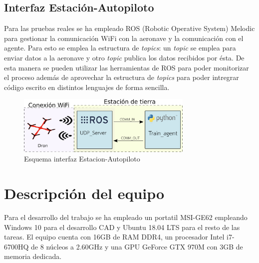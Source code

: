

\subsection{Interfaz Estación-Autopiloto}

Para las pruebas reales se ha empleado ROS (Robotic Operative System) Melodic para gestionar la comunicación WiFi con la aeronave y la comunicación con el agente. Para esto se emplea la estructura de \textit{topics}: un \textit{topic} se emplea para enviar datos a la aeronave y otro \textit{topic} publica los datos recibidos por ésta. De esta manera se pueden utilizar las herramientas de ROS para poder monitorizar el proceso además de aprovechar la estructura de \textit{topics} para poder intregrar código escrito en distintos lenguajes de forma sencilla.

\begin{figure}[htb!]
	\centering
	\includegraphics[width=0.75\textwidth]{software/Arquitectura}
	\caption{Esquema interfaz Estacion-Autopiloto}
	\label{hardware:esc_explicacion}
\end{figure}





\section{Descripción del equipo}
Para el desarrollo del trabajo se ha empleado un portatil MSI-GE62 empleando Windows 10 para el desarrollo CAD y Ubuntu 18.04 LTS para el resto de las tareas. El equipo cuenta con 16GB de RAM DDR4, un procesador Intel i7-6700HQ de 8 núcleos a 2.60GHz y una GPU GeForce GTX 970M con 3GB de memoria dedicada.

